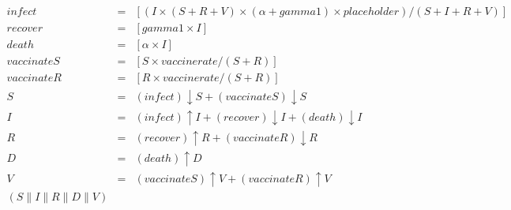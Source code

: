 \begin{eqnarray*}
\mathit{infect} & = & [(I\times (S+R+V)\times (\alpha+\mathit{gamma1})\times \mathit{placeholder})/(S+I+R+V)]\\%
\mathit{recover} & = & [\mathit{gamma1}\times I]\\%
\mathit{death} & = & [\alpha\times I]\\%
\mathit{vaccinateS} & = & [S\times \mathit{vaccinerate}/(S+R)]\\%
\mathit{vaccinateR} & = & [R\times \mathit{vaccinerate}/(S+R)]\\%
%
S & = & (\mathit{infect}){\downarrow}S + (\mathit{vaccinateS}){\downarrow}S\\%
I & = & (\mathit{infect}){\uparrow}I + (\mathit{recover}){\downarrow}I + (\mathit{death}){\downarrow}I\\%
R & = & (\mathit{recover}){\uparrow}R + (\mathit{vaccinateR}){\downarrow}R\\%
D & = & (\mathit{death}){\uparrow}D\\%
V & = & (\mathit{vaccinateS}){\uparrow}V + (\mathit{vaccinateR}){\uparrow}V\\%
%
(S {\parallel} I {\parallel} R {\parallel} D {\parallel} V)\end{eqnarray*}
